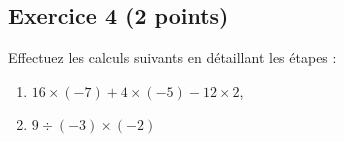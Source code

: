 \documentclass[14 pt]{extarticle}
\theoremstyle{plain}
\begin{document}
\subsection*{Exercice 4 (2 points)}


Effectuez les calculs suivants en détaillant les étapes : 
\begin{enumerate}
\item $16 \times (-7) + 4 \times (-5) - 12 \times 2$, 
\item $ 9 \div (-3) \times (-2)$
\end{enumerate}

%
%


 	
\end{document}
